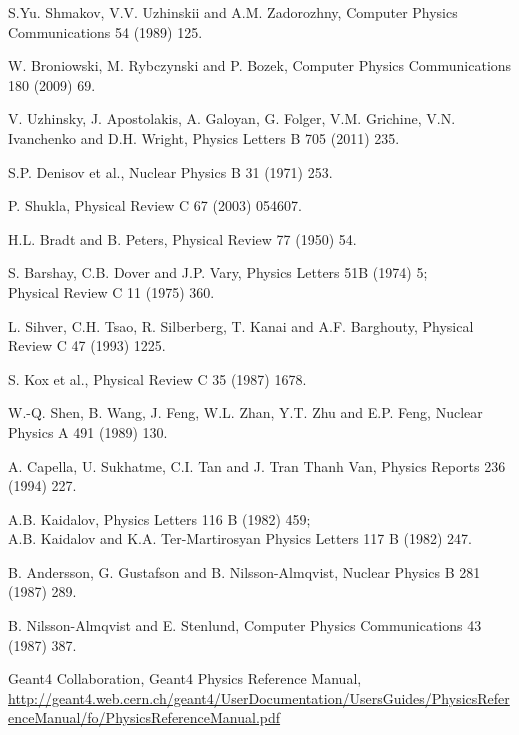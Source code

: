  S.Yu. Shmakov, V.V. Uzhinskii and A.M. Zadorozhny,
                       Computer Physics Communications 54 (1989) 125.

 W. Broniowski, M. Rybczynski and P. Bozek,
                        Computer Physics Communications 180 (2009) 69.

 V. Uzhinsky, J. Apostolakis, A. Galoyan, G. Folger, V.M. Grichine,
                        V.N. Ivanchenko and D.H. Wright,
                        Physics Letters B 705 (2011) 235.

 S.P. Denisov et al.,
                        Nuclear Physics B 31 (1971) 253.

 P. Shukla, Physical Review C 67 (2003) 054607.

 H.L. Bradt and B. Peters, Physical Review 77 (1950) 54.

 S. Barshay, C.B. Dover and J.P. Vary,
                      Physics Letters 51B (1974) 5; \\
                      Physical Review C 11 (1975) 360.

 L. Sihver, C.H. Tsao, R. Silberberg, T. Kanai and A.F. Barghouty,
                      Physical Review C 47 (1993) 1225.

 S. Kox et al., Physical Review C 35 (1987) 1678.

 W.-Q. Shen, B. Wang, J. Feng, W.L. Zhan, Y.T. Zhu and E.P. Feng,
                      Nuclear Physics A 491 (1989) 130.

 A. Capella, U. Sukhatme, C.I. Tan and J. Tran Thanh Van,
                      Physics Reports 236 (1994) 227.

 A.B. Kaidalov, Physics Letters 116 B (1982) 459; \\
                     A.B. Kaidalov and K.A. Ter-Martirosyan
                     Physics Letters 117 B (1982) 247.

 B. Andersson, G. Gustafson and B. Nilsson-Almqvist,
                      Nuclear Physics B 281 (1987) 289.

 B. Nilsson-Almqvist and E. Stenlund,
                      Computer Physics Communications 43 (1987) 387.

 Geant4 Collaboration, Geant4 Physics Reference Manual,
    \url{http://geant4.web.cern.ch/geant4/UserDocumentation/UsersGuides/PhysicsReferenceManual/fo/PhysicsReferenceManual.pdf}

